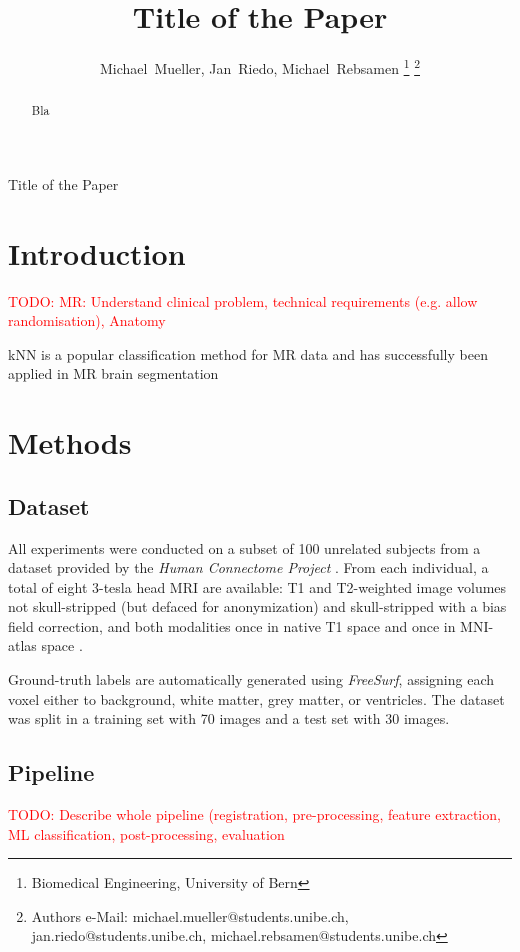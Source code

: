 \documentclass[journal]{IEEEtran}
\newcommand\TODO[1]{\textcolor{red}{TODO: #1}}
\begin{document}
\title{Title of the Paper}


\author{Michael~Mueller,
        Jan~Riedo,
        Michael~Rebsamen%
\thanks{Biomedical Engineering, University of Bern}%
\thanks{Authors e-Mail: michael.mueller@students.unibe.ch, jan.riedo@students.unibe.ch, michael.rebsamen@students.unibe.ch}}%
%
{Title of the Paper}
\maketitle

\begin{abstract}
Bla
\end{abstract}

\section{Introduction}
\TODO{MR: Understand clinical problem, technical requirements (e.g. allow randomisation), Anatomy}

kNN is a popular classification method for MR data and has successfully been applied in MR brain segmentation\cite{Anbeek2004,Cocosco2003,Warfield2000}


\section{Methods}

\subsection{Dataset}
All experiments were conducted on a subset of 100 unrelated subjects from a dataset provided by the \textit{Human Connectome Project} \cite{van2013wu}. From each individual, a total of eight 3-tesla head MRI are available: T1 and T2-weighted image volumes not skull-stripped (but defaced for anonymization) and skull-stripped with a bias field correction, and both modalities once in native T1 space and once in MNI-atlas space \cite{mazziotta2001probabilistic}.

Ground-truth labels are automatically generated using \textit{FreeSurf}, assigning each voxel either to background, white matter, grey matter, or ventricles. The dataset was split in a training set with 70 images and a test set with 30 images.
\subsection{Pipeline}
\TODO{Describe whole pipeline (registration, pre-processing, feature extraction, ML classification, post-processing, evaluation}
\end{document}
